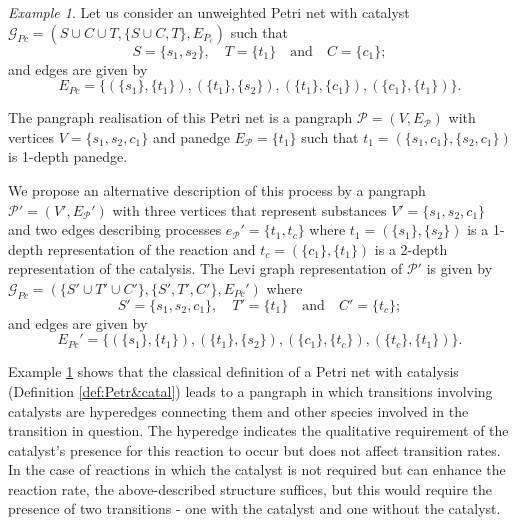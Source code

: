\documentclass[a4paper,12pt]{article}
\theoremstyle{definition}
\theoremstyle{remark}
\newtheorem{exam}{Example}
\newcommand{\mG}{\mathcal{G}}
\newcommand{\mP}{\mathcal{P}}
\begin{document}
\begin{exam}\label{exam:2petri}
Let us consider an unweighted Petri net with catalyst $\mG_{Pc}=(S\cup C\cup T, \{S\cup C, T\}, E_{P_c})$ such that 
\begin{equation*}
S=\{s_1,s_2\},\quad T=\{t_1\}\quad \text{and}\quad C=\{c_1\};
\end{equation*}
and edges are given by
\begin{equation*}
E_{Pc}=\{(\{s_1\},\{t_1\}), (\{t_1\},\{s_2\}), (\{t_1\},\{c_1\}), (\{c_1\},\{t_1\})\}.
\end{equation*}

\noindent  The pangraph realisation of this Petri net is a pangraph $\mP=(V,E_{\mP})$ with vertices $V=\{s_1,s_2,c_1\}$ and panedge $E_{\mP}=\{t_1\}$ such that $t_1=(\{s_1,c_1\},\{s_2,c_1\})$ is 1-depth panedge.

We propose an alternative description of this process by a pangraph $\mP'=(V',E_{\mP}')$ with three vertices that represent substances $V'=\{s_1,s_2,c_1\}$ and two edges describing processes $e_{\mP}'=\{t_1,t_c\}$ where $t_1=(\{s_1\},\{s_2\})$ is a 1-depth representation of the reaction and $t_c=(\{c_1\},\{t_1\})$ is a 2-depth representation of the catalysis. The Levi graph representation of $\mP'$ is given by $\mG_{Pc}=(\{S' \cup T' \cup C'\},\{S',T',C'\},E_{Pc}')$ where 
\begin{equation*}
S'=\{s_1,s_2,c_1\},\quad T'=\{t_1\}\quad \text{and}\quad C'=\{t_c\};
\end{equation*}
and edges are given by
\begin{equation*}
   E_{Pc}'=\{(\{s_1\},\{t_1\}), (\{t_1\},\{s_2\}), (\{c_1\},\{t_c\}), (\{t_c\},\{t_1\})\}.
\end{equation*}
\end{exam}

Example \ref{exam:2petri} shows that the classical definition of a Petri net with catalysis (Definition \ref{def:Petr&catal}) leads to a pangraph in which transitions involving catalysts are hyperedges connecting them and other species involved in the transition in question. The hyperedge indicates the qualitative requirement of the catalyst's presence for this reaction to occur but does not affect transition rates. In the case of reactions in which the catalyst is not required but can enhance the reaction rate, the above-described structure suffices, but this would require the presence of two transitions - one with the catalyst and one without the catalyst.
\end{document}
